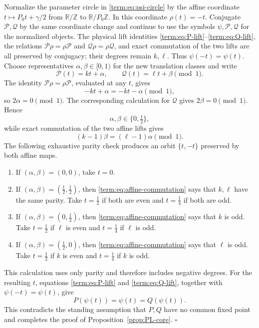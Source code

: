 \documentclass[11pt]{article}
\theoremstyle{definition}
\theoremstyle{remark}
\begin{document}
Normalize the parameter circle in \eqref{term:eq:psi-circle} by the affine coordinate
\(t\mapsto P_0t+\gamma/2\) from \(\mathbb R/\mathbb Z\) to
\(\mathbb R/P_0\mathbb Z\).  In this coordinate \(\rho(t)=-t\).  Conjugate
\(\mathcal P,\mathcal Q\) by the same coordinate change and continue to use
the symbols \(\psi,\mathcal P,\mathcal Q\) for the normalized objects.  The
physical lift identities \eqref{term:eq:P-lift}--\eqref{term:eq:Q-lift}, the
relations \(\mathcal P\rho=\rho\mathcal P\) and
\(\mathcal Q\rho=\rho\mathcal Q\), and exact commutation of the two lifts are
all preserved by conjugacy; their degrees remain \(k,\ell\).  Thus
\(\psi(-t)=\psi(t)\).  Choose representatives
\(\alpha,\beta\in[0,1)\) for the new translation classes and write
\[
 \mathcal P(t)=kt+\alpha,\qquad
 \mathcal Q(t)=\ell t+\beta\pmod1.
\]
The identity \(\mathcal P\rho=\rho\mathcal P\), evaluated at any \(t\),
gives
\[
 -kt+\alpha=-kt-\alpha\pmod1,
\]
so \(2\alpha=0\pmod1\).  The corresponding calculation for \(\mathcal Q\)
gives \(2\beta=0\pmod1\).  Hence
\begin{equation}\label{term:eq:half-translations}
 \alpha,\beta\in\{0,\tfrac12\},
\end{equation}
while exact commutation of the two affine lifts gives
\begin{equation}\label{term:eq:affine-commutation}
 (k-1)\beta=(\ell-1)\alpha\pmod1.
\end{equation}
The following exhaustive parity check produces an orbit
\(\{t,-t\}\) preserved by both affine maps.
\begin{enumerate}
 \item[(i)] If \((\alpha,\beta)=(0,0)\), take \(t=0\).
 \item[(ii)] If \((\alpha,\beta)=(\tfrac12,\tfrac12)\), then
 \eqref{term:eq:affine-commutation} says that \(k,\ell\) have the same
 parity.  Take \(t=\tfrac12\) if both are even and \(t=\tfrac14\) if both
 are odd.
 \item[(iii)] If \((\alpha,\beta)=(0,\tfrac12)\), then
 \eqref{term:eq:affine-commutation} says that \(k\) is odd.  Take
 \(t=\tfrac12\) if \(\ell\) is even and \(t=\tfrac14\) if \(\ell\) is odd.
 \item[(iv)] If \((\alpha,\beta)=(\tfrac12,0)\), then
 \eqref{term:eq:affine-commutation} says that \(\ell\) is odd.  Take
 \(t=\tfrac12\) if \(k\) is even and \(t=\tfrac14\) if \(k\) is odd.
\end{enumerate}
This calculation uses only parity and therefore includes negative degrees.
For the resulting \(t\), equations \eqref{term:eq:P-lift} and
\eqref{term:eq:Q-lift}, together with \(\psi(-t)=\psi(t)\), give
\[
 P(\psi(t))=\psi(t)=Q(\psi(t)).
\]
This contradicts the standing assumption that \(P,Q\) have no common fixed
point and completes the proof of Proposition~\ref{prop:PL-core}.
\hfill\(\square\)\par
\end{document}

